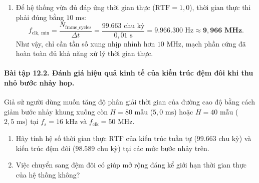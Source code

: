\begin{enumerate}[label=(\alph*)]
    \item Để hệ thống vừa đủ đáp ứng thời gian thực ($\text{RTF} = 1{,}0$), thời gian thực thi phải đúng bằng $10\text{ ms}$:
    \begin{equation}
        f_{\text{clk, min}} = \frac{N_{\text{frame\_cycles}}}{\Delta t} = \frac{99.663\text{ chu kỳ}}{0{,}01\text{ s}} = 9.966.300\text{ Hz} \approx \mathbf{9{,}966\text{ MHz}}.
    \end{equation}
    Như vậy, chỉ cần tần số xung nhịp nhỉnh hơn $10\text{ MHz}$, mạch phần cứng đã hoàn toàn đủ khả năng xử lý thời gian thực.
\end{enumerate}

\paragraph{Bài tập 12.2. Đánh giá hiệu quả kinh tế của kiến trúc đệm đôi khi thu nhỏ bước nhảy hop.}
Giả sử người dùng muốn tăng độ phân giải thời gian của đường cao độ bằng cách giảm bước nhảy khung xuống còn $H = 80\text{ mẫu}$ ($5{,}0\text{ ms}$) hoặc $H = 40\text{ mẫu}$ ($2{,}5\text{ ms}$) tại $f_s = 16\text{ kHz}$ và $f_{\text{clk}} = 50\text{ MHz}$.
\begin{enumerate}[label=(\alph*)]
    \item Hãy tính hệ số thời gian thực $\text{RTF}$ của kiến trúc tuần tự ($99.663\text{ chu kỳ}$) và kiến trúc đệm đôi ($98.589\text{ chu kỳ}$) tại các mức bước nhảy trên.
    \item Việc chuyển sang đệm đôi có giúp mở rộng đáng kể giới hạn thời gian thực của hệ thống không?
\end{enumerate}

